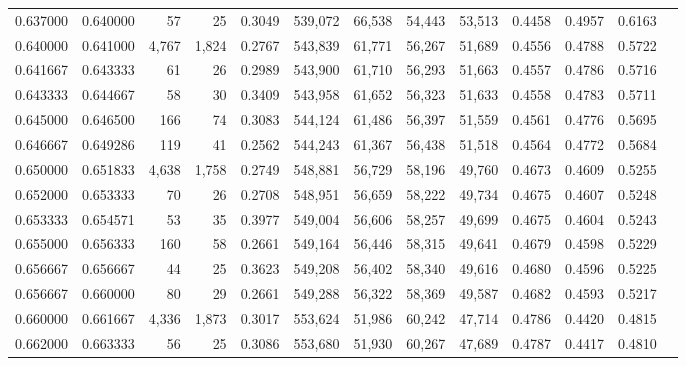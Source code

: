 \begin{tabular}{rrrrrrrrrrrrr}
0.637000 & 0.640000 &     57 &    25 &                                     0.3049 & 539,072 &  66,538 &  54,443 &  53,513 & 0.4458 & 0.4957 & 0.6163 \\
0.640000 & 0.641000 &  4,767 & 1,824 &                                     0.2767 & 543,839 &  61,771 &  56,267 &  51,689 & 0.4556 & 0.4788 & 0.5722 \\
0.641667 & 0.643333 &     61 &    26 &                                     0.2989 & 543,900 &  61,710 &  56,293 &  51,663 & 0.4557 & 0.4786 & 0.5716 \\
0.643333 & 0.644667 &     58 &    30 &                                     0.3409 & 543,958 &  61,652 &  56,323 &  51,633 & 0.4558 & 0.4783 & 0.5711 \\
0.645000 & 0.646500 &    166 &    74 &                                     0.3083 & 544,124 &  61,486 &  56,397 &  51,559 & 0.4561 & 0.4776 & 0.5695 \\
0.646667 & 0.649286 &    119 &    41 &                                     0.2562 & 544,243 &  61,367 &  56,438 &  51,518 & 0.4564 & 0.4772 & 0.5684 \\
0.650000 & 0.651833 &  4,638 & 1,758 &                                     0.2749 & 548,881 &  56,729 &  58,196 &  49,760 & 0.4673 & 0.4609 & 0.5255 \\
0.652000 & 0.653333 &     70 &    26 &                                     0.2708 & 548,951 &  56,659 &  58,222 &  49,734 & 0.4675 & 0.4607 & 0.5248 \\
0.653333 & 0.654571 &     53 &    35 &                                     0.3977 & 549,004 &  56,606 &  58,257 &  49,699 & 0.4675 & 0.4604 & 0.5243 \\
0.655000 & 0.656333 &    160 &    58 &                                     0.2661 & 549,164 &  56,446 &  58,315 &  49,641 & 0.4679 & 0.4598 & 0.5229 \\
0.656667 & 0.656667 &     44 &    25 &                                     0.3623 & 549,208 &  56,402 &  58,340 &  49,616 & 0.4680 & 0.4596 & 0.5225 \\
0.656667 & 0.660000 &     80 &    29 &                                     0.2661 & 549,288 &  56,322 &  58,369 &  49,587 & 0.4682 & 0.4593 & 0.5217 \\
0.660000 & 0.661667 &  4,336 & 1,873 &                                     0.3017 & 553,624 &  51,986 &  60,242 &  47,714 & 0.4786 & 0.4420 & 0.4815 \\
0.662000 & 0.663333 &     56 &    25 &                                     0.3086 & 553,680 &  51,930 &  60,267 &  47,689 & 0.4787 & 0.4417 & 0.4810 \\

\end{tabular}

